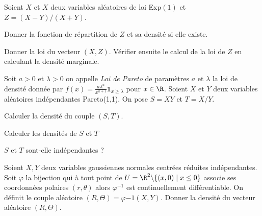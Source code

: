 \documentclass{report}
\begin{document}
\begin{exo}
    Soient \(X\) et \(X\) deux variables aléatoires de loi Exp\((1)\) et
    \(Z = (X-Y)/(X+Y)\).
    \begin{q}{1}
        Donner la fonction de répartition de \(Z\) et sa densité si elle existe.
    \end{q}
    \begin{q}{2}
        Donner la loi du vecteur \((X,Z)\). Vérifier ensuite le calcul de la loi
        de \(Z\) en calculant la densité marginale.
    \end{q}
\end{exo}

\begin{exo}
    Soit \(a>0\) et \(\lambda>0\) on appelle \textit{Loi de Pareto} de paramètres \(a\)
    et \(\lambda\) la loi de densité donnée par \(f(x)=\frac{a\lambda^a}{x^{a+1}}
    \mathds{1}_{x\geq\lambda}\) pour \(x\in\R\). Soient \(X\) et \(Y\) deux variables
    aléatoires indépendantes Pareto(1,1). On pose \(S=XY\) et \(T=X/Y\).
    \begin{q}{1}
        Calculer la densité du couple \((S,T)\).
    \end{q}
    \begin{q}{2}
        Calculer les densités de \(S\) et \(T\)
    \end{q}
    \begin{q}{3}
        \(S\) et \(T\) sont-elle indépendantes ?
    \end{q}
\end{exo}

\begin{exo}
    Soient \(X, Y\) deux variables gaussiennes normales centrées réduites indépendantes.
    Soit \(\varphi\) la bijection qui à tout point de \(U=\R^2\backslash\{(x,0)\mid x\leq 0\}\)
    associe ses coordonnées polaires \((r, \theta)\) alors \(\varphi^{-1}\) est
    continuellement différentiable. On définit le couple aléatoire \((R,\Theta) = \varphi{-1}(X,Y)\).
    Donner la densité du vecteur aléatoire \((R,\Theta)\).
\end{exo}
\end{document}
